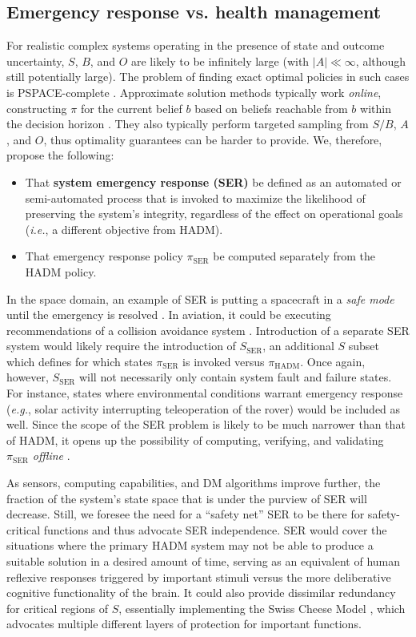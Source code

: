 \subsection{Emergency response vs. health management}

For realistic complex systems operating in the presence of state and outcome uncertainty, $S$, $B$, and $O$ are likely to be infinitely large (with $|A| \ll \infty$, although still potentially large). The problem of finding exact optimal policies in such cases is PSPACE-complete \cite{Papadimitriou1987}. Approximate solution methods typically work \textit{online}, constructing $\pi$ for the current belief $b$ based on beliefs reachable from $b$ within the decision horizon \cite{Browne2012}. They also typically perform targeted sampling from $S/B$, $A$, and $O$, thus optimality guarantees can be harder to provide. We, therefore, propose the following:
%
\begin{itemize}
	\item That \textbf{system emergency response (SER)} be defined as an automated or semi-automated process that is invoked to maximize the likelihood of preserving the system's integrity, regardless of the effect on operational goals (\textit{i.e.}, a different objective from HADM).
	\item That emergency response policy $\pi_\text{SER}$ be computed separately from the HADM policy.
\end{itemize}
%
In the space domain, an example of SER is putting a spacecraft in a \textit{safe mode} until the emergency is resolved \cite{Rasmussen2008}. In aviation, it could be executing recommendations of a collision avoidance system \cite{Kochenderfer2015}. Introduction of a separate SER system would likely require the introduction of $S_\text{SER}$, an additional $S$ subset which defines for which states $\pi_\text{SER}$ is invoked versus $\pi_\text{HADM}$. Once again, however, $S_\text{SER}$ will not necessarily only contain system fault and failure states. For instance, states where environmental conditions warrant emergency response (\textit{e.g.}, solar activity interrupting teleoperation of the rover) would be included as well. Since the scope of the SER problem is likely to be much narrower than that of HADM, it opens up the possibility of computing, verifying, and validating $\pi_\text{SER}$ \textit{offline} \cite{Kochenderfer2015}.

As sensors, computing capabilities, and DM algorithms improve further, the fraction of the system's state space that is under the purview of SER will decrease. Still, we foresee the need for a ``safety net'' SER to be there for safety-critical functions and thus advocate SER independence. SER would cover the situations where the primary HADM system may not be able to produce a suitable solution in a desired amount of time, serving as an equivalent of human reflexive responses triggered by important stimuli versus the more deliberative cognitive functionality of the brain. It could also provide dissimilar redundancy for critical regions of $S$, essentially implementing the Swiss Cheese Model \cite{Reason1990a}, which advocates multiple different layers of protection for important functions.

